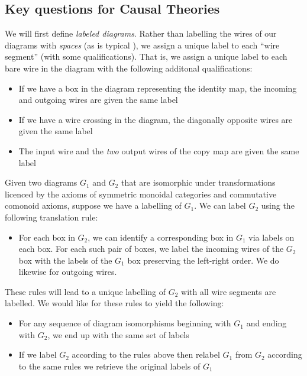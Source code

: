 \subsection{Key questions for Causal Theories}

We will first define \emph{labeled diagrams}. Rather than labelling the wires of our diagrams with \emph{spaces} (as is typical \citep{selinger_survey_2010}), we assign a unique label to each ``wire segment'' (with some qualifications).  That is, we assign a unique label to each bare wire in the diagram with the following additonal qualifications:
\begin{itemize}
	\item If we have a box in the diagram representing the identity map, the incoming and outgoing wires are given the same label
	\item If we have a wire crossing in the diagram, the diagonally opposite wires are given the same label
	\item The input wire and the \emph{two} output wires of the copy map are given the same label
\end{itemize}
Given two diagrams $G_1$ and $G_2$ that are isomorphic under transformations licenced by the axioms of symmetric monoidal categories and commutative comonoid axioms, suppose we have a labelling of $G_1$. We can label $G_2$ using the following translation rule:
\begin{itemize}
	\item For each box in $G_2$, we can identify a corresponding box in $G_1$ via labels on each box. For each such pair of boxes, we label the incoming wires of the $G_2$ box with the labels of the $G_1$ box preserving the left-right order. We do likewise for outgoing wires.
\end{itemize}

These rules will lead to a unique labelling of $G_2$ with all wire segments are labelled. We would like for these rules to yield the following:
\begin{itemize}
	\item For any sequence of diagram isomorphisms beginning with $G_1$ and ending with $G_2$, we end up with the same set of labels
	\item If we label $G_2$ according to the rules above then relabel $G_1$ from $G_2$ according to the same rules we retrieve the original labels of $G_1$
\end{itemize}

